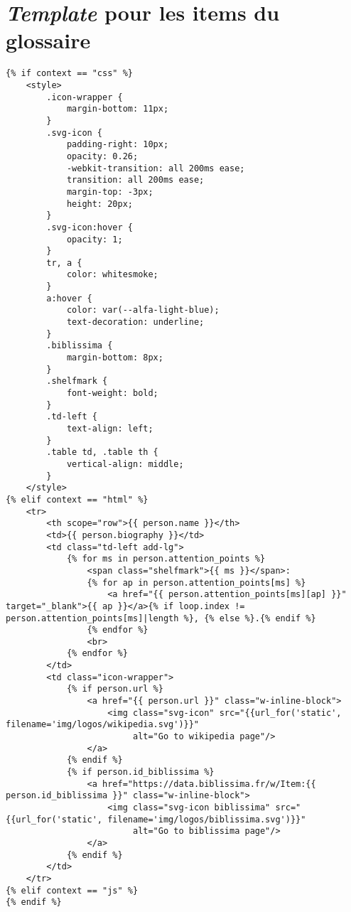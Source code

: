 \documentclass{article}
\begin{document}
\section{\textit{Template} pour les items du glossaire}
\begin{verbatim}
{% if context == "css" %}
    <style>
        .icon-wrapper {
            margin-bottom: 11px;
        }
        .svg-icon {
            padding-right: 10px;
            opacity: 0.26;
            -webkit-transition: all 200ms ease;
            transition: all 200ms ease;
            margin-top: -3px;
            height: 20px;
        }
        .svg-icon:hover {
            opacity: 1;
        }
        tr, a {
            color: whitesmoke;
        }
        a:hover {
            color: var(--alfa-light-blue);
            text-decoration: underline;
        }
        .biblissima {
            margin-bottom: 8px;
        }
        .shelfmark {
            font-weight: bold;
        }
        .td-left {
            text-align: left;
        }
        .table td, .table th {
            vertical-align: middle;
        }
    </style>
{% elif context == "html" %}
    <tr>
        <th scope="row">{{ person.name }}</th>
        <td>{{ person.biography }}</td>
        <td class="td-left add-lg">
            {% for ms in person.attention_points %}
                <span class="shelfmark">{{ ms }}</span>:
                {% for ap in person.attention_points[ms] %}
                    <a href="{{ person.attention_points[ms][ap] }}" target="_blank">{{ ap }}</a>{% if loop.index != person.attention_points[ms]|length %}, {% else %}.{% endif %}
                {% endfor %}
                <br>
            {% endfor %}
        </td>
        <td class="icon-wrapper">
            {% if person.url %}
                <a href="{{ person.url }}" class="w-inline-block">
                    <img class="svg-icon" src="{{url_for('static', filename='img/logos/wikipedia.svg')}}"
                         alt="Go to wikipedia page"/>
                </a>
            {% endif %}
            {% if person.id_biblissima %}
                <a href="https://data.biblissima.fr/w/Item:{{ person.id_biblissima }}" class="w-inline-block">
                    <img class="svg-icon biblissima" src="{{url_for('static', filename='img/logos/biblissima.svg')}}"
                         alt="Go to biblissima page"/>
                </a>
            {% endif %}
        </td>
    </tr>
{% elif context == "js" %}
{% endif %}

\end{verbatim}
\end{document}
